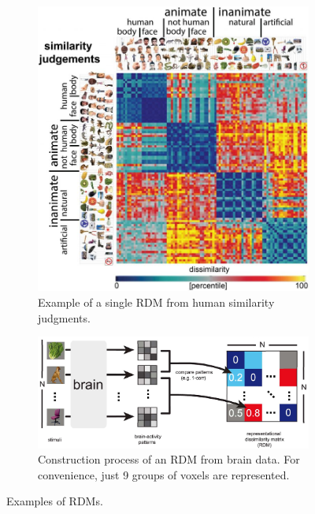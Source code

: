 \begin{figure}[!ht]
    \centering
    \captionsetup{width=.8\linewidth}
    \begin{subfigure}{.43\textwidth}
        \centering
        \captionsetup{width=.8\linewidth}
        \includegraphics[width=.6\linewidth]{images/rdm.jpg}
        \caption{Example of a single RDM from human similarity judgments.}
        \label{fig:rdm}
    \end{subfigure}
    \begin{subfigure}{.54\textwidth}
        \centering
        \captionsetup{width=.8\linewidth}
        \includegraphics[width=\linewidth]{images/rdm_brain.png}
        \caption{Construction process of an RDM from brain data. For convenience, just 9 groups of voxels are represented.}
        \label{fig:rdm_brain}
    \end{subfigure}
    \caption{Examples of RDMs.}
    \label{fig:rdms}
\end{figure}

